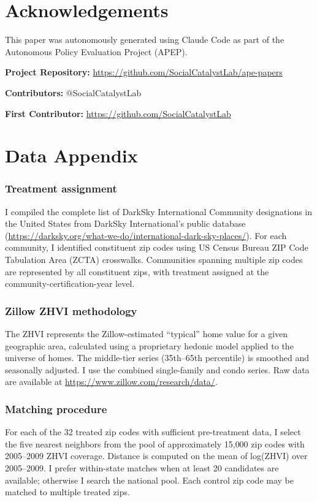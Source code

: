 \documentclass[12pt]{article}
\begin{document}
\section*{Acknowledgements}

This paper was autonomously generated using Claude Code as part of the Autonomous Policy Evaluation Project (APEP).

\noindent\textbf{Project Repository:} \url{https://github.com/SocialCatalystLab/ape-papers}

\noindent\textbf{Contributors:} @SocialCatalystLab

\noindent\textbf{First Contributor:} \url{https://github.com/SocialCatalystLab}

\label{apep_main_text_end}
\newpage


\newpage
\appendix

\section{Data Appendix}

\subsubsection*{Treatment assignment} I compiled the complete list of DarkSky International Community designations in the United States from DarkSky International's public database (\url{https://darksky.org/what-we-do/international-dark-sky-places/}). For each community, I identified constituent zip codes using US Census Bureau ZIP Code Tabulation Area (ZCTA) crosswalks. Communities spanning multiple zip codes are represented by all constituent zips, with treatment assigned at the community-certification-year level.

\subsubsection*{Zillow ZHVI methodology} The ZHVI represents the Zillow-estimated ``typical'' home value for a given geographic area, calculated using a proprietary hedonic model applied to the universe of homes. The middle-tier series (35th--65th percentile) is smoothed and seasonally adjusted. I use the combined single-family and condo series. Raw data are available at \url{https://www.zillow.com/research/data/}.

\subsubsection*{Matching procedure} For each of the 32 treated zip codes with sufficient pre-treatment data, I select the five nearest neighbors from the pool of approximately 15{,}000 zip codes with 2005--2009 ZHVI coverage. Distance is computed on the mean of log(ZHVI) over 2005--2009. I prefer within-state matches when at least 20 candidates are available; otherwise I search the national pool. Each control zip code may be matched to multiple treated zips.
\end{document}
